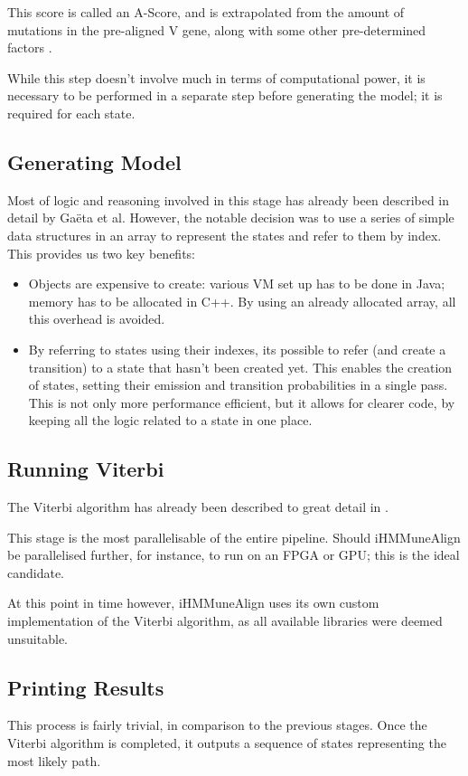 This score is called an A-Score, and is extrapolated from the amount of mutations in the pre-aligned V gene, along with some other pre-determined factors \cite{iHMMuneAlign}.

While this step doesn't involve much in terms of computational power, it is necessary to be performed in a separate step before generating the model; it is required for each state. 

\subsection{Generating Model}
\label{sec:pipeline-stage_3}
Most of logic and reasoning involved in this stage has already been described in detail by Ga\"{e}ta et al\autocite{iHMMuneAlign}. However, the notable decision was to use a series of simple data structures in an array to represent the states and refer to them by index. This provides us two key benefits:
\begin{itemize}
    \item Objects are expensive to create: various VM set up has to be done in Java; memory has to be allocated in C++. By using an already allocated array, all this overhead is avoided.
    \item By referring to states using their indexes, its possible to refer (and create a transition) to a state that hasn't been created yet. This enables the creation of states, setting their emission and transition probabilities in a single pass. This is not only more performance efficient, but it allows for clearer code, by keeping all the logic related to a state in one place.
\end{itemize}

\subsection{Running Viterbi}
\label{sec:pipeline-stage_4}
The Viterbi algorithm has already been described to great detail in . 

This stage is the most parallelisable of the entire pipeline. Should iHMMuneAlign be parallelised further, for instance, to run on an FPGA or GPU; this is the ideal candidate. 

At this point in time however, iHMMuneAlign uses its own custom implementation of the Viterbi algorithm, as all available libraries were deemed unsuitable. 

\subsection{Printing Results}
\label{sec:pipeline-stage_5}
This process is fairly trivial, in comparison to the previous stages. Once the Viterbi algorithm is completed, it outputs a sequence of states representing the most likely path.

